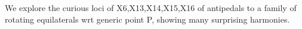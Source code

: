 We explore the curious loci of  X6,X13,X14,X15,X16 of antipedals to a family of rotating equilaterals wrt generic point P, showing many surprising harmonies.